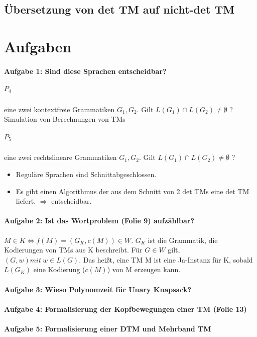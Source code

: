 \documentclass[ngerman]{scrartcl}
\begin{document}
\subsection{Übersetzung von det TM auf nicht-det TM}

\section{Aufgaben}

\paragraph{Aufgabe 1: Sind diese Sprachen entscheidbar?} 

\subparagraph{$ P_4 $} eine zwei kontextfreie Grammatiken $ G_1, G_2 $. Gilt $ L(G_1) \cap L(G_2) \neq \emptyset $ ? 
Simulation von Berechnungen von TMs

\subparagraph{$ P_5 $} eine zwei rechtslineare Grammatiken $ G_1, G_2 $. Gilt $ L(G_1) \cap L(G_2) \neq \emptyset $ ?  
\begin{itemize}
    \item Reguläre Sprachen sind Schnittabgeschlossen. 
    \item Es gibt einen Algorithmus der aus dem Schnitt von 2 det TMs eine det TM liefert. $ \Rightarrow $ entscheidbar.
\end{itemize}

\paragraph{Aufgabe 2: Ist das Wortproblem (Folie 9) aufzählbar?} $ M \in K \Leftrightarrow f(M) = (G_K, c(M)) \in W $. $G_K$ ist die Grammatik, die Kodierungen von TMs aus K beschreibt. Für $G \in W$ gilt, $(G, w) mit\ w \in L(G)$. Das heißt, eine TM M ist eine Ja-Instanz für K, sobald $L(G_K)$ eine Kodierung ($c(M)$) von M erzeugen kann.
\paragraph{Aufgabe 3: Wieso Polynomzeit für Unary Knapsack?}
\paragraph{Aufgabe 4: Formalisierung der Kopfbewegungen einer TM (Folie 13)}
\paragraph{Aufgabe 5: Formalisierung einer DTM und Mehrband TM}
\end{document}
